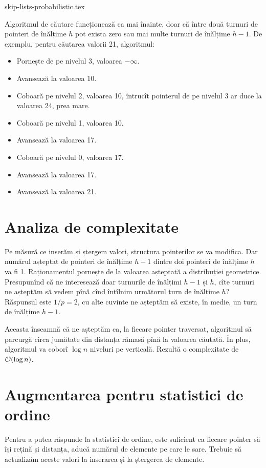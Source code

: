 \documentclass[../main.tex]{subfiles}
\begin{document}
{skip-lists-probabilistic.tex}

Algoritmul de căutare funcționează ca mai înainte, doar că între două turnuri de pointeri de înălțime $h$ pot exista zero sau mai multe turnuri de înălțime $h-1$. De exemplu, pentru căutarea valorii 21, algoritmul:

\begin{itemize}
  \item Pornește de pe nivelul 3, valoarea $-\infty$.
  \item Avansează la valoarea 10.
  \item Coboară pe nivelul 2, valoarea 10, întrucît pointerul de pe nivelul 3 ar duce la valoarea 24, prea mare.
  \item Coboară pe nivelul 1, valoarea 10.
  \item Avansează la valoarea 17.
  \item Coboară pe nivelul 0, valoarea 17.
  \item Avansează la valoarea 17.
  \item Avansează la valoarea 21.
\end{itemize}


\section{Analiza de complexitate}

Pe măsură ce inserăm și ștergem valori, structura pointerilor se va modifica. Dar numărul așteptat de pointeri de înălțime $h-1$ dintre doi pointeri de înălțime $h$ va fi 1. Raționamentul pornește de la valoarea așteptată a distribuției geometrice. Presupunînd că ne interesează doar turnurile de înălțimi $h-1$ și $h$, cîte turnuri ne așteptăm să vedem pînă cînd întîlnim următorul turn de înălțime $h$? Răspunsul este $1/p = 2$, cu alte cuvinte ne așteptăm să existe, în medie, un turn de înălțime $h-1$.

Aceasta înseamnă că ne așteptăm ca, la fiecare pointer traversat, algoritmul să parcurgă circa jumătate din distanța rămasă pînă la valoarea căutată. În plus, algoritmul va coborî $\log n$ niveluri pe verticală. Rezultă o complexitate de $\mathcal{O}(\log n)$.

\section{Augmentarea pentru statistici de ordine}

Pentru a putea răspunde la statistici de ordine, este suficient ca fiecare pointer să își rețină și distanța, aducă numărul de elemente pe care le sare. Trebuie să actualizăm aceste valori la inserarea și la ștergerea de elemente.
\end{document}
